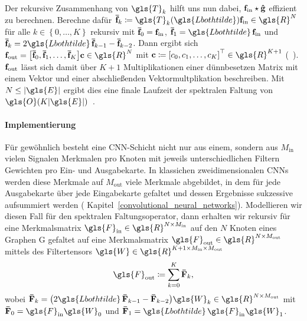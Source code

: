 Der rekursive Zusammenhang von $\gls{T}_k$ hilft uns nun dabei, $\mathbf{f}_{\mathrm{in}} \star \mathbf{\hat g}$ effizient zu berechnen.
Berechne dafür $\ve{\bar f}_k \coloneqq \gls{T}_k\left(\gls{Lbothtilde}\right)\ve{f}_{\mathrm{in}} \in \gls{R}^N$ für alle $k \in \left\lbrace0, \ldots, K\right\rbrace$ rekursiv mit $\mathbf{\bar f}_0 = \mathbf{f}_{\mathrm{in}}$, $\ve{\bar f}_1 = \gls{Lbothtilde}\,\ve{f}_{\mathrm{in}}$ und $\ve{\bar f}_k = 2 \gls{Lbothtilde}\,\ve{\bar f}_{k-1} - \ve{\bar f}_{k - 2}$.
Dann ergibt sich $\ve{f}_{\mathrm{out}} = \left[\ve{\bar f}_0, \ve{\bar f}_1, \ldots, \ve{\bar f}_K\right]\ve{c} \in \gls{R}^N$ mit $\ve{c} \coloneqq {\left[c_0, c_1, \ldots, c_K\right]}^{\top} \in \gls{R}^{K+1}$ (\vgl{}~\cite{Hammond}).
$\mathbf{f}_{\mathrm{out}}$ lässt sich damit über $K + 1$ Multiplikationen einer dünnbesetzen Matrix mit einem Vektor und einer abschließenden Vektormultplikation beschreiben.
Mit $N \leq \left|\gls{E}\right|$ ergibt dies eine finale Laufzeit der spektralen Faltung von $\gls{O}\left(K\left|\gls{E}\right|\right)$~\cite{Defferrard}.

\paragraph{Implementierung}
\label{tschebyschow_tensor}

Für gewöhnlich besteht eine \gls{CNN}-Schicht nicht nur aus einem, sondern aus $M_{\mathrm{in}}$ vielen Signalen \bzw{} Merkmalen pro Knoten mit jeweils unterschiedlichen Filtern \bzw{} Gewichten pro Ein- und Ausgabekarte.
In klassichen zweidimensionalen \glspl{CNN} werden diese Merkmale auf $M_{\mathrm{out}}$ viele Merkmale abgebildet, in dem für jede Ausgabekarte über jede Eingabekarte gefaltet und dessen Ergebnisse sukzessive aufsummiert werden (\vgl{} Kapitel~\ref{convolutional_neural_networks}).
Modellieren wir diesen Fall für den spektralen Faltungsoperator, dann erhalten wir rekursiv für eine Merkmalsmatrix $\gls{F}_{\mathrm{in}} \in \gls{R}^{N \times M_{\mathrm{in}}}$ auf den $N$ Knoten eines Graphen \gls{G} gefaltet auf eine Merkmalsmatrix $\gls{F}_{\mathrm{out}} \in \gls{R}^{N \times M_{\mathrm{out}}}$ mittels des Filtertensors $\gls{W} \in \gls{R}^{K+1 \times M_{\mathrm{in}} \times M_{\mathrm{out}}}$
\begin{equation*}
  \gls{F}_{\mathrm{out}} \coloneqq \sum_{k=0}^K \ma{\bar F}_k,
\end{equation*}
wobei $\ma{\bar F}_k = \left(2\gls{Lbothtilde}\,\ma{\bar F}_{k -1} -  \ma{\bar F}_{k - 2}\right)\gls{W}_k \in \gls{R}^{N \times M_{\mathrm{out}}}$ mit $\ma{\bar F}_0 = \gls{F}_{\mathrm{in}}\gls{W}_0$ und $\ma{\bar F}_1 = \gls{Lbothtilde}\,\gls{F}_{\mathrm{in}}\gls{W}_1$.
